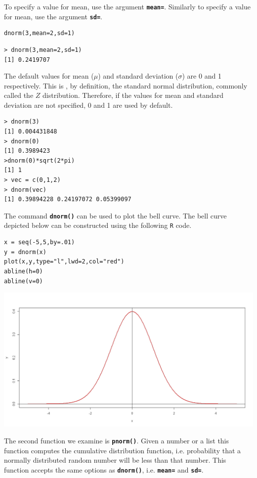 \documentclass[a4paper,12pt]{article}
\begin{document}
To specify a value for mean, use the argument \textbf{\texttt{mean=}}. Similarly to specify a value for mean, use the argument \textbf{\texttt{sd=}}.


\begin{verbatim}
dnorm(3,mean=2,sd=1)
\end{verbatim}

\begin{verbatim}
> dnorm(3,mean=2,sd=1)
[1] 0.2419707
\end{verbatim}
The default values for mean ($\mu$) and standard deviation ($\sigma$) are 0 and 1 respectively. This is , by definition, the standard normal distribution, commonly called the $Z$ distribution. Therefore, if the values for mean and standard deviation are not specified, 0 and 1 are used by default.
\begin{verbatim}
> dnorm(3)
[1] 0.004431848
> dnorm(0)
[1] 0.3989423
>dnorm(0)*sqrt(2*pi)
[1] 1
> vec = c(0,1,2)
> dnorm(vec)
[1] 0.39894228 0.24197072 0.05399097
\end{verbatim}
The command \texttt{\textbf{dnorm()}} can be used to plot the bell curve. The bell curve depicted below can be constructed using the following \texttt{R} code.

\begin{verbatim}
x = seq(-5,5,by=.01)
y = dnorm(x) 
plot(x,y,type="l",lwd=2,col="red")
abline(h=0)
abline(v=0)
\end{verbatim}

 \begin{center}
 \includegraphics[scale=0.30]{dnormCurve}
 \end{center}
 

The second function we examine is \texttt{\textbf{pnorm()}}. Given a number or a list this function computes the cumulative distribution function, i.e. probability that a normally distributed random number will be less than that number. This function accepts the same options as \texttt{\textbf{dnorm()}}, i.e. \texttt{\textbf{mean=}} and \texttt{\textbf{sd=}}.
\end{document}
